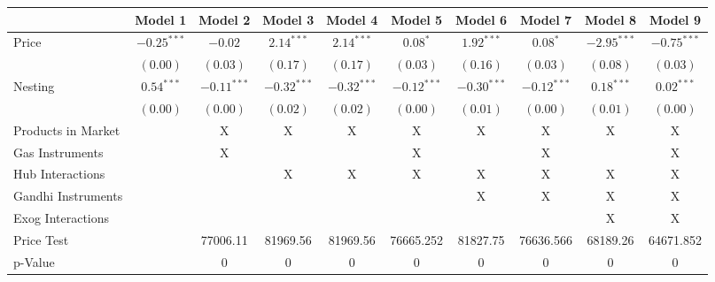 
\begin{tabular}{l c c c c c c c c c}
\toprule
 & Model 1 & Model 2 & Model 3 & Model 4 & Model 5 & Model 6 & Model 7 & Model 8 & Model 9 \\
\midrule
Price                       & $-0.25^{***}$ & $-0.02$       & $2.14^{***}$  & $2.14^{***}$  & $0.08^{*}$    & $1.92^{***}$  & $0.08^{*}$    & $-2.95^{***}$ & $-0.75^{***}$ \\
                            & $(0.00)$      & $(0.03)$      & $(0.17)$      & $(0.17)$      & $(0.03)$      & $(0.16)$      & $(0.03)$      & $(0.08)$      & $(0.03)$      \\
Nesting                     & $0.54^{***}$  & $-0.11^{***}$ & $-0.32^{***}$ & $-0.32^{***}$ & $-0.12^{***}$ & $-0.30^{***}$ & $-0.12^{***}$ & $0.18^{***}$  & $0.02^{***}$  \\
                            & $(0.00)$      & $(0.00)$      & $(0.02)$      & $(0.02)$      & $(0.00)$      & $(0.01)$      & $(0.00)$      & $(0.01)$      & $(0.00)$      \\
\midrule
Products in Market          &               & X             & X             & X             & X             & X             & X             & X             & X             \\
Gas Instruments             &               & X             &               &               & X             &               & X             &               & X             \\
Hub Interactions            &               &               & X             & X             & X             & X             & X             & X             & X             \\
Gandhi Instruments          &               &               &               &               &               & X             & X             & X             & X             \\
Exog Interactions           &               &               &               &               &               &               &               & X             & X             \\
Price Test                  &               & 77006.11      & 81969.56      & 81969.56      & 76665.252     & 81827.75      & 76636.566     & 68189.26      & 64671.852     \\
p-Value                     &               & 0             & 0             & 0             & 0             & 0             & 0             & 0             & 0             \\

\end{tabular}
